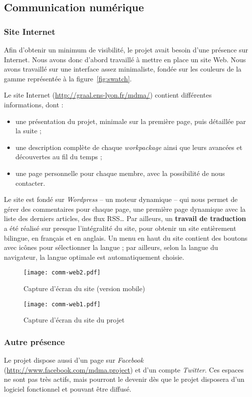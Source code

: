 \subsection{Communication numérique}
\subsubsection{Site Internet}
\par Afin d'obtenir un minimum de visibilité, le projet avait besoin d'une présence sur Internet. Nous avons donc d'abord travaillé à mettre en place un site Web. Nous avons travaillé sur une interface assez minimaliste, fondée sur les couleurs de la gamme représentée à la figure~\ref{fig:swatch}.
\par Le site Internet (\url{http://graal.ens-lyon.fr/mdma/}) contient différentes informations, dont :
\begin{itemize}
  \item une présentation du projet, minimale sur la première page, puis détaillée par la suite ;
  \item une description complète de chaque \emph{workpackage} ainsi que leurs avancées et découvertes au fil du temps ;
  \item une page personnelle pour chaque membre, avec la possibilité de nous contacter.
\end{itemize}
\par Le site est fondé sur \emph{Wordpress} -- un moteur dynamique -- qui nous permet de gérer des commentaires pour chaque page, une première page dynamique avec la liste des derniers articles, des flux RSS… Par ailleurs, un \textbf{travail de traduction} a été réalisé sur presque l'intégralité du site, pour obtenir un site entièrement bilingue, en français et en anglais. Un menu en haut du site contient des boutons avec icônes pour sélectionner la langue ; par ailleurs, selon la langue du navigateur, la langue optimale est automatiquement choisie.
\begin{figure}[H]
  \centering
    \texttt{[image: comm-web2.pdf]}
  \caption{Capture d'écran du site (version mobile)}
\end{figure}
\begin{figure}[H]
  \centering
    \texttt{[image: comm-web1.pdf]}
  \caption{Capture d'écran du site du projet}
\end{figure}
\subsubsection{Autre présence}
\par Le projet dispose aussi d'un page sur \emph{Facebook} (\url{http://www.facebook.com/mdma.project}) et d'un compte \emph{Twitter}. Ces espaces ne sont pas très actifs, mais pourront le devenir dès que le projet disposera d'un logiciel fonctionnel et pouvant être diffusé.
